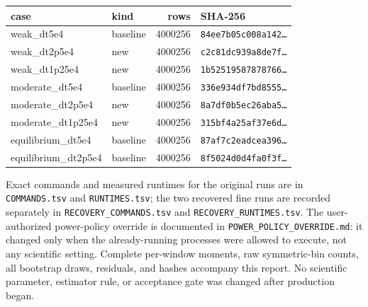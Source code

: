 \documentclass[10pt]{article}
\begin{document}
\begin{tabular}{l l r l}
\toprule
case & kind & rows & SHA-256\\
\midrule
weak\_dt5e4 & baseline & 4000256 & \texttt{84ee7b05c008a142\ldots} \\
weak\_dt2p5e4 & new & 4000256 & \texttt{c2c81dc939a8de7f\ldots} \\
weak\_dt1p25e4 & new & 4000256 & \texttt{1b52519587878766\ldots} \\
moderate\_dt5e4 & baseline & 4000256 & \texttt{336e934df7bd8555\ldots} \\
moderate\_dt2p5e4 & new & 4000256 & \texttt{8a7df0b5ec26aba5\ldots} \\
moderate\_dt1p25e4 & new & 4000256 & \texttt{315bf4a25af37e6d\ldots} \\
equilibrium\_dt5e4 & baseline & 4000256 & \texttt{87af7c2eadcea396\ldots} \\
equilibrium\_dt2p5e4 & baseline & 4000256 & \texttt{8f5024d0d4fa0f3f\ldots} \\
\bottomrule
\end{tabular}

Exact commands and measured runtimes for the original runs are in
\texttt{COMMANDS.tsv} and \texttt{RUNTIMES.tsv}; the two recovered fine
runs are recorded separately in \texttt{RECOVERY\_COMMANDS.tsv} and
\texttt{RECOVERY\_RUNTIMES.tsv}.  The user-authorized power-policy override
is documented in \texttt{POWER\_POLICY\_OVERRIDE.md}: it changed only when
the already-running processes were allowed to execute, not any scientific
setting.  Complete per-window moments, raw symmetric-bin counts, all bootstrap
draws, residuals, and hashes accompany this report.  No scientific parameter,
estimator rule, or acceptance gate was changed after production began.
\end{document}
